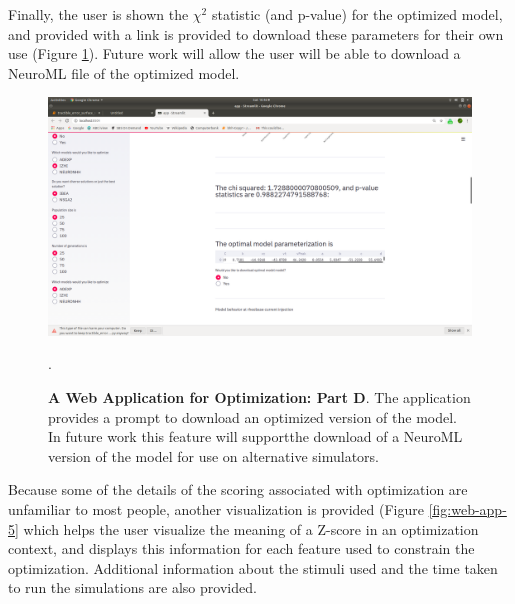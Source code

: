 Finally, the user is shown the $\chi^{2}$ statistic (and p-value) for the optimized model, and provided with a link is provided to download these parameters for their own use (Figure \ref{fig:web-app-4}).
Future work will allow the user will be able to download a NeuroML file of the optimized model.

\begin{figure}
\begin{center}
\includegraphics[scale=1]{chapters/app_tex/Screenshot from 2020-09-19 10-46-32}
\end{center}
\caption[Web application (4)]{\textbf{A Web Application for Optimization: Part D}.
The application provides a prompt to download an optimized version of the model. In future work this feature will supportthe download of a NeuroML version of the model for use on alternative simulators.}
\label{fig:web-app-4}.
\end{figure}

Because some of the details of the scoring associated with optimization are unfamiliar to most people, another visualization is provided (Figure \ref{fig:web-app-5} which helps the user visualize the meaning of a Z-score in an optimization context, and displays this information for each feature used to constrain the optimization.
Additional information about the stimuli used and the time taken to run the simulations are also provided.

